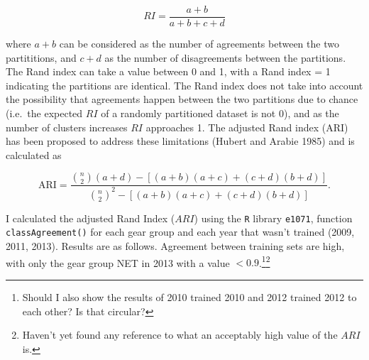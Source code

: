 \documentclass[]{article}
\begin{document}
\[ RI = \frac{a + b}{a + b + c + d} \]

where $a + b$ can be considered as the number of agreements between the
two partititions, and $c + d$ as the number of disagreements between the
partitions. The Rand index can take a value between 0 and 1, with a Rand
index = 1 indicating the partitions are identical. The Rand index does
not take into account the possibility that agreements happen between the
two partitions due to chance (i.e.~the expected $RI$ of a randomly
partitioned dataset is not 0), and as the number of clusters increases
$RI$ approaches 1. The adjusted Rand index (ARI) has been proposed to
address these limitations (Hubert and Arabie 1985) and is calculated as

\[ \text{ARI} = \frac{ {n \choose 2}(a + d) - [(a+b)(a+c) + (c+d)(b+d)]  }{ {n\choose 2}^2 - [(a+b)(a+c) + (c+d)(b+d)]}.\]

I calculated the adjusted Rand Index ($ARI$) using the \texttt{R}
library \texttt{e1071}, function \texttt{classAgreement()} for each gear
group and each year that wasn't trained (2009, 2011, 2013). Results are
as follows. Agreement between training sets are high, with only the gear
group NET in 2013 with a value $< 0.9$.\footnote{Should I also show the
  results of 2010 trained 2010 and 2012 trained 2012 to each other? Is
  that circular?}\footnote{Haven't yet found any reference to what an
  acceptably high value of the $ARI$ is.}
\end{document}
